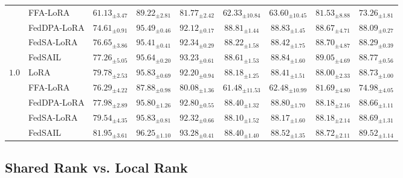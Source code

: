 \documentclass[11pt,letterpaper]{article}
\begin{document}
\begin{table}[htbp!]
\begin{tabular*}{\linewidth}{@{\extracolsep{\fill}}clccccccc@{}}
               & FFA-LoRA    & $61.13_{\pm 3.47}$ & $89.22_{\pm 2.81}$ & $81.77_{\pm 2.42}$ & $62.33_{\pm 10.84}$ & $63.60_{\pm 10.45}$ & $81.53_{\pm 8.88}$ & $73.26_{\pm 1.81}$ \\
               & FedDPA-LoRA & $74.61_{\pm 0.91}$ & $95.49_{\pm 0.46}$ & $92.12_{\pm 0.17}$ & $\mathbf{88.81}_{\pm 1.44}$ & $88.83_{\pm 1.45}$ & $88.67_{\pm 4.71}$ & $88.09_{\pm 0.27}$ \\
               & FedSA-LoRA  & $76.65_{\pm 3.86}$ & $95.41_{\pm 0.41}$ & $92.34_{\pm 0.29}$ & $88.22_{\pm 1.58}$ & $88.42_{\pm 1.75}$ & $88.70_{\pm 4.87}$ & $88.29_{\pm 0.39}$ \\
               & FedSAIL      & $\mathbf{77.26}_{\pm 5.05}$ & $\mathbf{95.64}_{\pm 0.20}$ & $\mathbf{93.23}_{\pm 0.61}$ & $88.61_{\pm 1.53}$ & $\mathbf{88.84}_{\pm 1.60}$ & $\mathbf{89.05}_{\pm 4.69}$ & $\mathbf{88.77}_{\pm 0.56}$ \\
        \addlinespace
        $1.0$ & LoRA        & $79.78_{\pm 2.53}$ & $95.83_{\pm 0.69}$ & $92.20_{\pm 0.94}$ & $88.18_{\pm 1.25}$ & $88.41_{\pm 1.51}$ & $88.00_{\pm 2.33}$ & $88.73_{\pm 1.00}$ \\
              & FFA-LoRA    & $76.29_{\pm 4.22}$ & $87.88_{\pm 0.98}$ & $80.08_{\pm 1.36}$ & $61.48_{\pm 11.53}$ & $62.48_{\pm 10.99}$ & $81.69_{\pm 4.80}$ & $74.98_{\pm 4.05}$ \\
              & FedDPA-LoRA & $77.98_{\pm 2.89}$ & $95.80_{\pm 1.26}$ & $92.80_{\pm 0.55}$ & $\mathbf{88.40}_{\pm 1.32}$ & $\mathbf{88.80}_{\pm 1.70}$ & $88.18_{\pm 2.16}$ & $88.66_{\pm 1.11}$ \\
              & FedSA-LoRA  & $79.54_{\pm 4.35}$ & $95.83_{\pm 0.81}$ & $92.32_{\pm 0.66}$ & $88.10_{\pm 1.52}$ & $88.17_{\pm 1.60}$ & $88.18_{\pm 2.14}$ & $88.69_{\pm 1.31}$ \\
              & FedSAIL      & $\mathbf{81.95}_{\pm 3.61}$ & $\mathbf{96.25}_{\pm 1.10}$ & $\mathbf{93.28}_{\pm 0.41}$ & $\mathbf{88.40}_{\pm 1.40}$ & $88.52_{\pm 1.35}$ & $\mathbf{88.72}_{\pm 2.11}$ & $\mathbf{89.52}_{\pm 1.14}$ \\
        \bottomrule
\end{tabular*}
\end{table}






\subsection{Shared Rank vs. Local Rank}
\label{sec:asymmetric-capacity}
\end{document}
